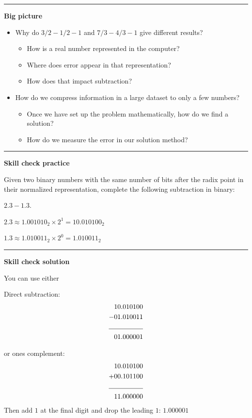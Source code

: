 \documentclass[12pt,letterpaper,noanswers]{exam}
\begin{document}
\hrule
\vspace{0.2cm}


\noindent\textbf{Big picture}
\begin{itemize}
    \itemsep0pt
\item Why do $3/2 - 1/2 - 1$ and $7/3 - 4/3 - 1$ give different results?
\begin{itemize}
    \itemsep0pt
    \item How is a real number represented in the computer?
    \item Where does error appear in that representation?
    \item How does that impact subtraction?
\end{itemize}
\item How do we compress information in a large dataset to only a few numbers?  
\begin{itemize}
    \item Once we have set up the problem mathematically, how do we find a solution?
    \item How do we measure the error in our solution method?
\end{itemize}
\end{itemize}

\vspace{0.2cm}
\hrule
\vspace{0.2cm}

\noindent \textbf{Skill check practice}

Given two binary numbers with the same number of bits after the radix point in their normalized representation, complete the following subtraction in binary:

$2.3 - 1.3$.

$2.3 \approx 1.001010_2\times 2^1 = 10.010100_2$

$1.3 \approx 1.010011_2 \times 2^0 = 1.010011_2$


\vspace{0.2cm}
\hrule
\vspace{0.2cm}

\noindent \textbf{Skill check solution}

You can use either

Direct subtraction:
\begin{align*}
&10.010100 \\
- &01.010011 \\
\cline{1-2}
&01.000001
\end{align*}

or ones complement:
\begin{align*}
&10.010100 \\
+ &00.101100 \\
\cline{1-2}
&11.000000
\end{align*}
Then add $1$ at the final digit and drop the leading $1$:
$1.000001$
\end{document}
